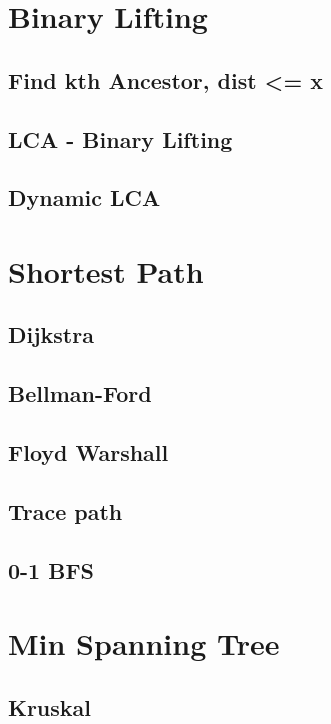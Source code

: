 \section{Binary Lifting}
	\subsection{Find kth Ancestor, dist <= x}
	\subsection{LCA - Binary Lifting}
	\subsection{Dynamic LCA}

	
\section{Shortest Path}
	\subsection{Dijkstra}
	\subsection{Bellman-Ford}
	\subsection{Floyd Warshall}
	\subsection{Trace path}
	\subsection{0-1 BFS}

\section{Min Spanning Tree}
	\subsection{Kruskal}
